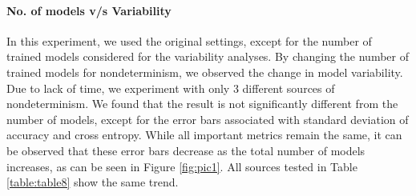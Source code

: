 \paragraph{No. of models v/s Variability}
In this experiment, we used the original settings, except for the number of trained models considered for the variability analyses. By changing the number of trained models for nondeterminism, we observed the change in model variability. Due to lack of time, we experiment with only 3 different sources of nondeterminism. We found that the result is not significantly different from the number of models, except for the error bars associated with standard deviation of accuracy and cross entropy. While all important metrics remain the same, it can be observed that these error bars decrease as the total number of models increases, as can be seen in Figure \ref{fig:pic1}. All sources tested in Table \ref{table:table8} show the same trend.
